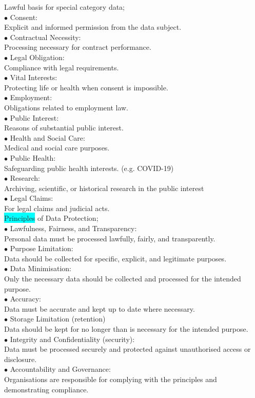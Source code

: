 \documentclass[tikz,border=10pt]{project_plan}
\newcommand{\bulletPoint}{\hspace{-3.1pt}$\bullet$ \hspace{5pt}}
\begin{document}
\newpage

Lawful basis for special category data;\\
\bulletPoint  Consent:\\
Explicit and informed permission from the data subject.\\
\bulletPoint Contractual Necessity:\\
Processing necessary for contract performance.\\
\bulletPoint Legal Obligation:\\
Compliance with legal requirements.\\
\bulletPoint Vital Interests:\\
Protecting life or health when consent is impossible.\\
\bulletPoint Employment:\\
Obligations related to employment law.\\
\bulletPoint Public Interest:\\
Reasons of substantial public interest.\\
\bulletPoint Health and Social Care:\\
Medical and social care purposes.\\
\bulletPoint Public Health:\\
Safeguarding public health interests. (e.g. COVID-19)\\
\bulletPoint Research:\\
Archiving, scientific, or historical research in the public interest\\
\bulletPoint Legal Claims:\\
For legal claims and judicial acts.\\

\colorbox{cyan}{Principles} of Data Protection;\\
\bulletPoint Lawfulness, Fairness, and Transparency:\\
Personal data must be processed lawfully, fairly, and transparently.\\
\bulletPoint Purpose Limitation:\\
Data should be collected for specific, explicit, and legitimate purposes.\\
\bulletPoint Data Minimisation:\\
Only the necessary data should be collected and processed for the intended purpose.\\
\bulletPoint Accuracy:\\
Data must be accurate and kept up to date where necessary.\\
\bulletPoint Storage Limitation (retention)\\
Data should be kept for no longer than is necessary for the intended purpose.\\
\bulletPoint Integrity and Confidentiality (security):\\
Data must be processed securely and protected against unauthorised access or disclosure.\\
\bulletPoint Accountability and Governance:\\
Organisations are responsible for complying with the principles and demonstrating compliance.
\end{document}
